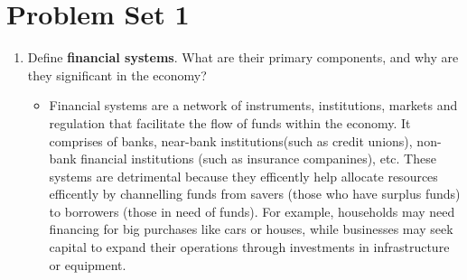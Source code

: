 \newpage

\section{Problem Set 1}

\begin{enumerate}

    \item Define \textbf{financial systems}. What are their primary components, and why are
    they significant in the economy?
       \begin{itemize}
           \item Financial systems are a network of instruments, institutions, markets and regulation that facilitate the flow of funds within the economy. It comprises of banks, near-bank institutions(such as credit unions), non-bank financial institutions (such as insurance companines), etc. These systems are detrimental because 
                 they efficently help allocate resources efficently by channelling funds from savers (those who have surplus funds) to borrowers (those in need of funds). For example, households may need financing for big purchases like cars or houses, while businesses may seek capital to expand their operations through investments in
                 infrastructure or equipment. 
       \end{itemize}


\end{enumerate}
